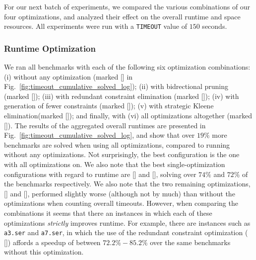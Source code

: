 For our next batch of experiments, we compared the various combinations of our four optimizations, and analyzed their effect on the overall runtime and space resources.
%
All experiments were run with a \texttt{TIMEOUT} value of $150$ seconds.

\subsubsection{Runtime Optimization}

We ran all benchmarks with each of the following six optimization combinations: 
(i) without any optimization (marked [\texttt{\textbf{\text{-}\text{-}\text{-}\text{-}}}] in Fig.~\ref{fig:timeout_cumulative_solved_log}); (ii) with bidrectional pruning (marked [\texttt{\textbf{\text{-}\text{-}\text{-}}}]); (iii) with redundant constraint elimination (marked [\texttt{\textbf{\text{-}\text{-}\text{-}}}]); (iv) with generation of fewer constraints (marked [\texttt{\textbf{\text{-}\text{-}\text{-}}}]);
(v) with strategic Kleene elimination(marked [\texttt{\textbf{\text{-}\text{-}\text{-}}}]);
and finally, with (vi) all optimizations altogether (marked [\texttt{\textbf{}}]).
%
The results of the aggregated overall runtimes are presented in Fig.~\ref{fig:timeout_cumulative_solved_log}, and show that over $19\%$ more benchmarks are solved when using all optimizations, compared to running without any optimizations.
%
Not surprisingly, the best configuration is the one with all optimizations on. 
%
We also note that the best single-optimization configurations with regard to runtime are [\texttt{\textbf{\text{-}\text{-}\text{-}}}] and [\texttt{\textbf{\text{-}\text{-}\text{-}}}], solving over $74\%$ and $72\%$ of the benchmarks respectively. 
%
We also note that the two remaining optimizations, [\texttt{\textbf{\text{-}\text{-}\text{-}}}] and [\texttt{\textbf{\text{-}\text{-}\text{-}}}], performed slightly worse (although not by much) than without the optimizations when counting overall timeouts.
%
However, when comparing the combinations it seems that there an instances in which each of these optimizations \textit{strictly} improves runtime.
%
For example, there are instances such as \texttt{a3.ser} and \texttt{a7.ser}, in which the use of the redundant constraint optimization (  [\texttt{\textbf{\text{-}\text{-}\text{-}}}])
affords a speedup of between $72.2\%-85.2\%$ over the same benchmarks without this optimization.




